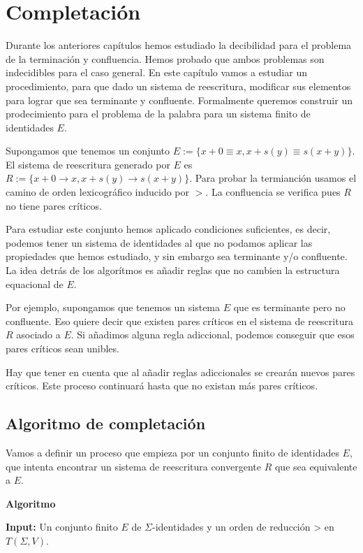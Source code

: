 \chapter{Completación}

Durante los anteriores capítulos hemos estudiado la decibilidad para
el problema de la terminación y confluencia. Hemos probado que ambos
problemas son indecidibles para el caso general. En este capítulo
vamos a estudiar un procedimiento, para que dado un sistema de
reescritura, modificar sus elementos para lograr que sea terminante y
confluente. Formalmente queremos construir un prodecimiento para el
problema de la palabra para un sistema finito de identidades $E$.

Supongamos que tenemos un conjunto
$E := \{ x + 0 \equiv x, x + s(y) \equiv s(x+y) \}$. El sistema de
reescritura generado por $E$ es
$R := \{ x + 0 \rightarrow x, x + s(y) \rightarrow s(x+y)\}$.  Para
probar la termianción usamos el camino de orden lexicográfico inducido
por $>$. La confluencia se verifica pues $R$ no tiene pares críticos.

Para estudiar este conjunto hemos aplicado condiciones suficientes, es
decir, podemos tener un sistema de identidades al que no podamos
aplicar las propiedades que hemos estudiado, y sin embargo sea
terminante y/o confluente. La idea detrás de los algorítmos es añadir
reglas que no cambien la estructura equacional de $E$.

Por ejemplo, supongamos que tenemos un sistema $E$ que es terminante
pero no confluente. Eso quiere decir que existen pares críticos en el
sistema de reescritura $R$ asociado a $E$. Si añadimos alguna regla
adiccional, podemos conseguir que esos pares críticos sean unibles.

Hay que tener en cuenta que al añadir reglas adiccionales se crearán
nuevos pares críticos. Este proceso continuará hasta que no existan
más pares críticos.

\section{Algoritmo de completación}

Vamos a definir un proceso que empieza por un conjunto finito de
identidades $E$, que intenta encontrar un sistema de reescritura
convergente $R$ que sea equivalente a $E$.

\textbf{Algoritmo} \hrulefill

\textbf{Input:} Un conjunto finito $E$ de $\Sigma$-identidades y un
orden de reducción > en $T(\Sigma, V)$.

